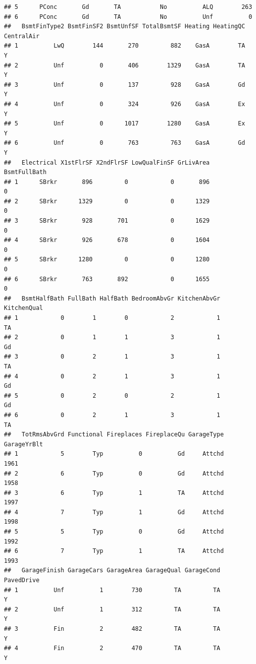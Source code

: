 \documentclass[
]{article}
\begin{document}
\begin{verbatim}
## 5      PConc       Gd       TA           No          ALQ        263
## 6      PConc       Gd       TA           No          Unf          0
##   BsmtFinType2 BsmtFinSF2 BsmtUnfSF TotalBsmtSF Heating HeatingQC CentralAir
## 1          LwQ        144       270         882    GasA        TA          Y
## 2          Unf          0       406        1329    GasA        TA          Y
## 3          Unf          0       137         928    GasA        Gd          Y
## 4          Unf          0       324         926    GasA        Ex          Y
## 5          Unf          0      1017        1280    GasA        Ex          Y
## 6          Unf          0       763         763    GasA        Gd          Y
##   Electrical X1stFlrSF X2ndFlrSF LowQualFinSF GrLivArea BsmtFullBath
## 1      SBrkr       896         0            0       896            0
## 2      SBrkr      1329         0            0      1329            0
## 3      SBrkr       928       701            0      1629            0
## 4      SBrkr       926       678            0      1604            0
## 5      SBrkr      1280         0            0      1280            0
## 6      SBrkr       763       892            0      1655            0
##   BsmtHalfBath FullBath HalfBath BedroomAbvGr KitchenAbvGr KitchenQual
## 1            0        1        0            2            1          TA
## 2            0        1        1            3            1          Gd
## 3            0        2        1            3            1          TA
## 4            0        2        1            3            1          Gd
## 5            0        2        0            2            1          Gd
## 6            0        2        1            3            1          TA
##   TotRmsAbvGrd Functional Fireplaces FireplaceQu GarageType GarageYrBlt
## 1            5        Typ          0          Gd     Attchd        1961
## 2            6        Typ          0          Gd     Attchd        1958
## 3            6        Typ          1          TA     Attchd        1997
## 4            7        Typ          1          Gd     Attchd        1998
## 5            5        Typ          0          Gd     Attchd        1992
## 6            7        Typ          1          TA     Attchd        1993
##   GarageFinish GarageCars GarageArea GarageQual GarageCond PavedDrive
## 1          Unf          1        730         TA         TA          Y
## 2          Unf          1        312         TA         TA          Y
## 3          Fin          2        482         TA         TA          Y
## 4          Fin          2        470         TA         TA          Y

\end{verbatim}
\end{document}
